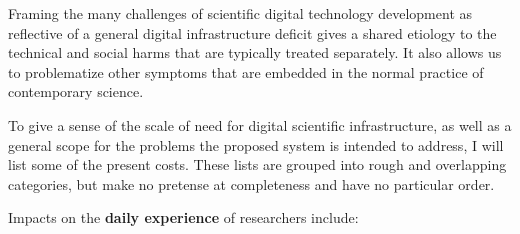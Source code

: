 \documentclass[10pt]{article}
\begin{document}
\begin{multicols}{2}


Framing the many challenges of scientific digital technology development
as reflective of a general digital infrastructure deficit gives a shared
etiology to the technical and social harms that are typically treated
separately. It also allows us to problematize other symptoms that are
embedded in the normal practice of contemporary science.

To give a sense of the scale of need for digital scientific
infrastructure, as well as a general scope for the problems the proposed
system is intended to address, I will list some of the present costs.
These lists are grouped into rough and overlapping categories, but make
no pretense at completeness and have no particular order.

Impacts on the \textbf{daily experience} of researchers include:

\begin{itemize}


\end{itemize}
\end{multicols}
\end{document}
